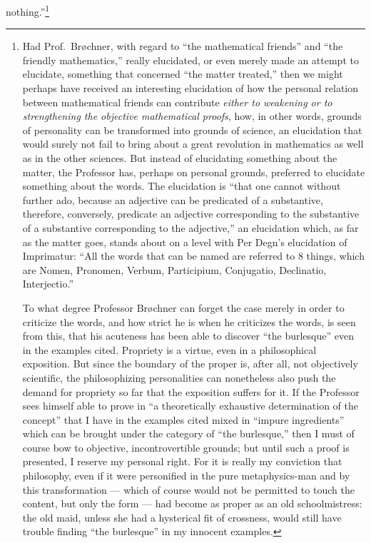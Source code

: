 \documentclass[12pt]{book}
\begin{document}
nothing.''\footnote{Had Prof.\ Brøchner, with regard to ``the mathematical
friends'' and ``the friendly mathematics,'' really elucidated, or even
merely made an attempt to elucidate, something that concerned ``the matter
treated,'' then we might perhaps have received an interesting elucidation of
how the personal relation between mathematical friends can contribute
\emph{either to weakening or to strengthening the objective mathematical
proofs}, how, in other words, grounds of personality can be transformed into
grounds of science, an elucidation that would surely not fail to bring about
a great revolution in mathematics as well as in the other sciences. But
instead of elucidating something about the matter, the Professor has, perhaps
on personal grounds, preferred to elucidate something about the words. The
elucidation is ``that one cannot without further ado, because an adjective
can be predicated of a substantive, therefore, conversely, predicate an
adjective corresponding to the substantive of a substantive corresponding to
the adjective,'' an elucidation which, as far as the matter goes, stands about
on a level with Per Degn's elucidation of Imprimatur: ``All the words that
can be named are referred to 8 things, which are Nomen, Pronomen, Verbum,
Participium, Conjugatio, Declinatio, Interjectio.''

To what degree Professor Brøchner can forget the case merely in order to
criticize the words, and how strict he is when he criticizes the words, is
seen from this, that his acuteness has been able to discover ``the
burlesque'' even in the examples cited. Propriety is a virtue, even in a
philosophical exposition. But since the boundary of the proper is, after
all, not objectively scientific, the philosophizing personalities can
nonetheless also push the demand for propriety so far that the exposition
suffers for it. If the Professor sees himself able to prove in ``a
theoretically exhaustive determination of the concept'' that I have in the
examples cited mixed in ``impure ingredients'' which can be brought under
the category of ``the burlesque,'' then I must of course bow to objective,
incontrovertible grounds; but until such a proof is presented, I reserve my
personal right. For it is really my conviction that philosophy, even if it
were personified in the pure metaphysics-man and by this transformation ---
which of course would not be permitted to touch the content, but only the
form --- had become as proper as an old schoolmistress: the old maid, unless
she had a hysterical fit of crossness, would still have trouble finding
``the burlesque'' in my innocent examples.}
\end{document}
